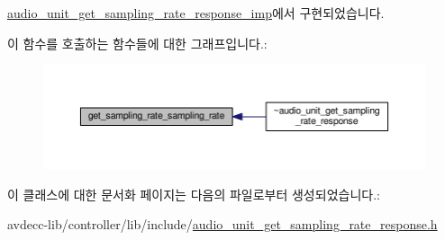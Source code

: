 \hyperlink{classavdecc__lib_1_1audio__unit__get__sampling__rate__response__imp_a88d3a898cb13a63391a290b5265b7c8f}{audio\+\_\+unit\+\_\+get\+\_\+sampling\+\_\+rate\+\_\+response\+\_\+imp}에서 구현되었습니다.



이 함수를 호출하는 함수들에 대한 그래프입니다.\+:
\nopagebreak
\begin{figure}[H]
\begin{center}
\leavevmode
\includegraphics[width=350pt]{classavdecc__lib_1_1audio__unit__get__sampling__rate__response_ab629a51b3da0b2eb0349ee370aaf0004_icgraph}
\end{center}
\end{figure}




이 클래스에 대한 문서화 페이지는 다음의 파일로부터 생성되었습니다.\+:\begin{DoxyCompactItemize}
\item 
avdecc-\/lib/controller/lib/include/\hyperlink{audio__unit__get__sampling__rate__response_8h}{audio\+\_\+unit\+\_\+get\+\_\+sampling\+\_\+rate\+\_\+response.\+h}\end{DoxyCompactItemize}
